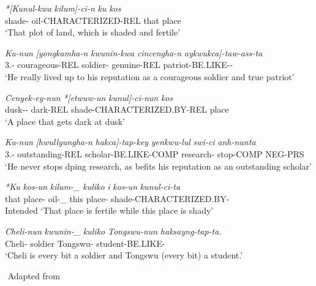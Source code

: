 \begin{exe}
    \ex \label{koreanlexical}
    \begin{xlist}
    \ex \label{koreanconjoined1}
    \gll
    \textit{*[Kunul-kwa} \textit{kilum]-ci-n} \textit{ku} \textit{kos} \\ shade-{\Conj} oil-CHARACTERIZED-REL that place \\
    \glt `That plot of land, which is shaded and fertile'
    
    \ex \label{koreanconjoined2}
    \gll 
    \textit{Ku-nun} \textit{[yongkamha-n} \textit{kwunin-kwa} \textit{cincengha-n} \textit{aykwukca]-taw-ass-ta}\\
    3.{\Sg}-{\Top} courageous-REL soldier-{\Conj} genuine-REL patriot-BE.LIKE-{\Pst}-{\Decl} \\
    \glt `He really lived up to his reputation as a courageous soldier and true patriot'
 
    
    \ex \label{koreanmodified1}
    \gll 
    \textit{Cenyek-ey-nun} \textit{*[etwuw-un} \textit{kunul]-ci-nun} \textit{kos} \\ dusk-{\Loc}-{\Top} dark-REL shade-CHARACTERIZED.BY-REL place\\
    \glt `A place that gets dark at dusk'
    
    \ex \label{koreanmodified2}
    \gll 
    \textit{Ku-nun} \textit{[hwullyungha-n} \textit{hakca]-tap-key} \textit{yenkwu-lul} \textit{swi-ci} \textit{anh-nunta} \\ 3.{\Sg}-{\Top} outstanding-REL scholar-BE.LIKE-COMP research-{\Acc} stop-COMP NEG-PRS \\
    \glt `He never stops dping research, as befits his reputation as an outstanding scholar'
    
    
    \ex \label{koreangapping1}
    \gll 
    \textit{*Ku} \textit{kos-un}  \textit{kilum-\_} \textit{kuliko} \textit{i} \textit{kos-un} \textit{kunul-ci-ta} \\ that place-{\Top} oil-\_ {\And} this place-{\Top} shade-CHARACTERIZED.BY-{\Decl} \\
    \glt Intended `That place is fertile while this place is shady'
    
    \ex \label{koreangapping2}
    \gll 
    \textit{Cheli-nun} \textit{kwunin-\_} \textit{kuliko} \textit{Tongswu-nun} \textit{haksayng-tap-ta.} \\ Cheli-{\Top} soldier {\And} Tongswu-{\Top} student-BE.LIKE-{\Decl} \\
    \glt `Cheli is every bit a soldier and Tongswu (every bit) a student.'
    \end{xlist}
    ${}$ \hfill Adapted from \cite{yoon2017lexical}
\end{exe}

